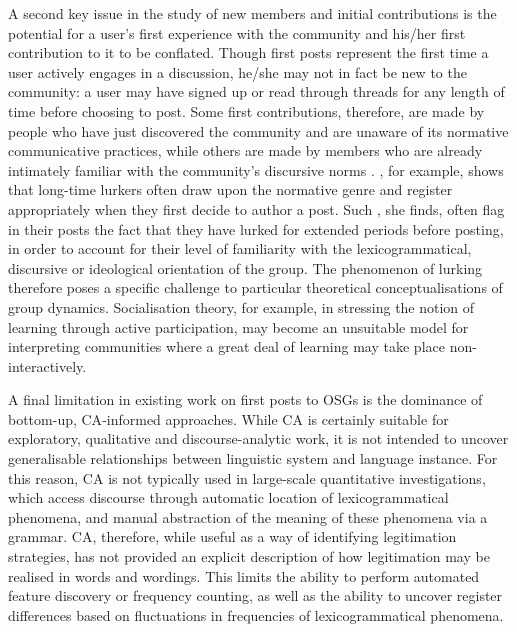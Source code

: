 A second key issue in the study of new \glspl{member} and initial contributions is the potential for a user's first experience with the community and his\slash her first contribution to it to be conflated. Though first \glspl{post} represent the first time a user actively engages in a discussion, he\slash she may not in fact be new to the community: a user may have signed up or read through \glspl{thread} for any length of time before choosing to 
\gls{post}. Some first contributions, therefore, are made by people who have just discovered the community and are unaware of its normative communicative practices, while others are made by \glspl{member} who are already intimately familiar with the community's discursive norms \cite{dennen_pedagogical_2008,han_social_2012,preece_top_2004,smithson_membership_2011}. \textcite{weber_missed_2011}, for example, shows that long\hyp{}time lurkers often draw upon the normative genre and register appropriately when they first decide to author a \gls{post}. Such , she finds, often flag in their \glspl{post} the fact that they have lurked for extended periods before posting, in order to account for their level of familiarity with the lexicogrammatical, discursive or ideological orientation of the group. The phenomenon of lurking therefore poses a specific challenge to particular theoretical conceptualisations of group dynamics. Socialisation theory, for example, in stressing the notion of learning through active participation, may become an unsuitable model for interpreting communities where a great deal of learning may take place non\hyp{}interactively.

A final limitation in existing work on first posts to \glspl{OSG} is the dominance of bottom\hyp{}up, \gls{CA}\hyp{}informed approaches. While \gls{CA} is certainly suitable for exploratory, qualitative and discourse\hyp{}analytic work, it is not intended to uncover generalisable relationships between linguistic system and language instance. For this reason, \gls{CA} is not typically used in large\hyp{}scale quantitative investigations, which access discourse through automatic location of lexicogrammatical phenomena, and manual abstraction of the meaning of these phenomena via a grammar. \gls{CA}, therefore, while useful as a way of identifying legitimation strategies, has not provided an explicit description of how legitimation may be realised in words and wordings. This limits the ability to perform automated feature discovery or frequency counting, as well as the ability to uncover register differences based on fluctuations in frequencies of lexicogrammatical phenomena.

